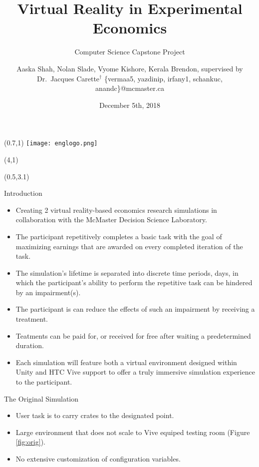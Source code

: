 \documentclass[22pt]{beamer}
\title{Virtual Reality in Experimental Economics}
\subtitle{Computer Science Capstone Project}
\author[Shah, Slade, Kishore, Brendon \& Carette]{Aaska Shah, Nolan Slade, Vyome Kishore, Kerala Brendon, supervised by Dr.~Jacques Carette$^\dagger$ \vspace{0.3cm} \newline \small \{vermaa5, yazdinip, irfany1, schankuc, anandc\}@mcmaster.ca}
\institute[McMaster University]{$^\dagger$Department of Computing and Software, McMaster University

1280 Main St. W, Hamilton, Ontario, Canada L8S 4L8}
\date{December 5th, 2018}
\begin{document}

\begin{frame}[fragile]

\begin{textblock}{2}(0.7,1)
\texttt{[image: englogo.png]} %
\end{textblock}

\begin{textblock}{8}(4,1)
\titlepage
\end{textblock}

\begin{textblock}{7.25}(0.5,3.1)

\begin{block}{Introduction}
\begin{itemize}
\item Creating 2 virtual reality-based economics research simulations in collaboration with the McMaster Decision Science Laboratory.
\item The participant repetitively completes a basic task with the goal of maximizing
earnings that are awarded on every completed iteration of the task.
\item The simulation's lifetime is separated into discrete time periods, days, in which the participant's ability to perform the repetitive task can be hindered by an impairment(s).
\item The participant is can reduce the
effects of such an impairment by receiving a treatment.
\item Teatments can be paid for, or received for free after waiting a predetermined duration.
\item Each simulation will feature both a virtual environment designed within Unity
and HTC Vive support to offer a truly immersive simulation experience to the
participant.
\end{itemize}

\end{block}

\begin{block}{The Original Simulation}
\begin{itemize}
\item User task is to carry crates to the designated point.
\item Large environment that does not scale to Vive equiped testing room (Figure \ref{fig:orig}).
\item No extensive customization of configuration variables.
\end{itemize}


\end{block}
\end{textblock}
\end{frame}
\end{document}
